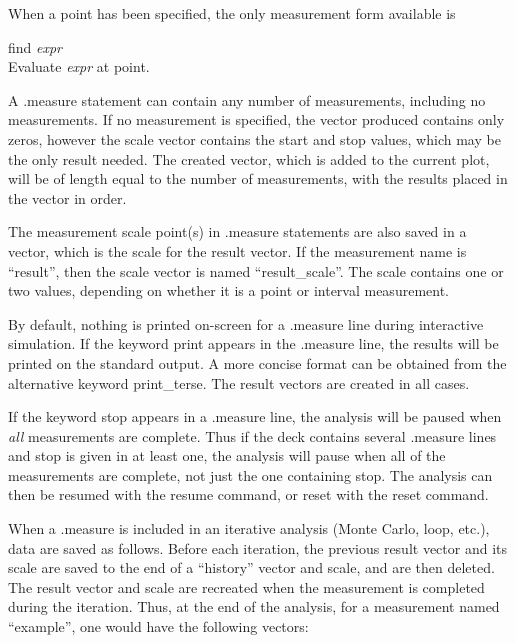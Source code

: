 When a point has been specified, the only measurement form
available is

\begin{description}
\item{{\vt find} {\it expr}}\\
Evaluate {\it expr} at point.
\end{description}

A {\vt .measure} statement can contain any number of measurements,
including no measurements.  If no measurement is specified, the vector
produced contains only zeros, however the scale vector contains the
start and stop values, which may be the only result needed.  The
created vector, which is added to the current plot, will be of length
equal to the number of measurements, with the results placed in the
vector in order.

The measurement scale point(s) in {\vt .measure} statements are also
saved in a vector, which is the scale for the result vector.  If the
measurement name is ``{\vt result}'', then the scale vector is named
``{\vt result\_scale}''.  The scale contains one or two values,
depending on whether it is a point or interval measurement.

By default, nothing is printed on-screen for a {\vt .measure} line
during interactive simulation.  If the keyword {\vt print} appears in
the {\vt .measure} line, the results will be printed on the standard
output.  A more concise format can be obtained from the alternative
keyword {\vt print\_terse}.  The result vectors are created in all
cases.

If the keyword {\vt stop} appears in a {\vt .measure} line, the
analysis will be paused when {\it all} measurements are complete. 
Thus if the deck contains several {\vt .measure} lines and {\vt stop}
is given in at least one, the analysis will pause when all of the
measurements are complete, not just the one containing {\vt stop}. 
The analysis can then be resumed with the {\cb resume} command, or
reset with the {\cb reset} command.

When a {\vt .measure} is included in an iterative analysis (Monte
Carlo, loop, etc.), data are saved as follows.  Before each iteration,
the previous result vector and its scale are saved to the end of a
``history'' vector and scale, and are then deleted.  The result vector
and scale are recreated when the measurement is completed during the
iteration.  Thus, at the end of the analysis, for a measurement named
``example'', one would have the following vectors:

